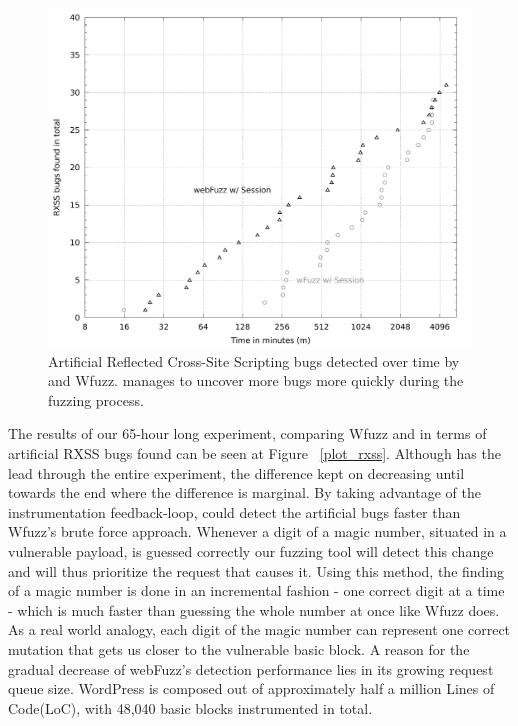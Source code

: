 \begin{figure}[!htb]
  \centering \includegraphics[width=\linewidth]{figures/plot_bugs.pdf}
  \caption{ Artificial Reflected Cross-Site Scripting bugs detected over time by \pname{} and Wfuzz. \pname{} manages to uncover more bugs more quickly during the fuzzing process.} 
  \label{fig:plot_rxss}
\end{figure}

The results of our 65-hour long experiment, comparing Wfuzz and \pname{} in terms of artificial RXSS bugs found can be seen at Figure ~\ref{plot_rxss}. Although \pname{} has the lead through the entire experiment, the difference kept on decreasing until towards the end where the difference is marginal. By taking advantage of the instrumentation feedback-loop, \pname{} could detect the artificial bugs faster than Wfuzz's brute force approach. Whenever a digit of a magic
number, situated in a vulnerable payload, is guessed correctly our fuzzing tool will detect this change and will thus prioritize the request that causes it. Using this method, the finding of a magic number is done in an incremental fashion - one correct digit at a time - which is much faster than guessing the whole number at once like Wfuzz does. As a real world analogy, each digit of the magic number can represent one correct mutation that gets us closer to the vulnerable basic block. A reason for the gradual decrease of webFuzz's detection performance lies in its growing request queue size. WordPress is composed out of approximately half a million Lines of Code(LoC), with 48,040 basic blocks instrumented in total.

